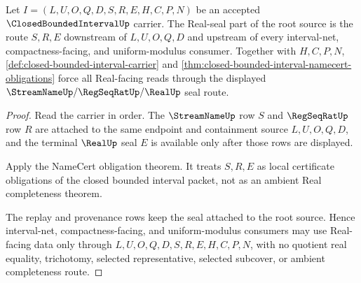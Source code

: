 \begin{theorem}
\label{thm:closed-bounded-interval-root-seal-split}
Let $I=(L,U,O,Q,D,S,R,E,H,C,P,N)$ be an accepted $\ClosedBoundedIntervalUp$ carrier. The Real-seal part of the root source is the route $S,R,E$ downstream of $L,U,O,Q,D$ and upstream of every interval-net, compactness-facing, and uniform-modulus consumer. Together with $H,C,P,N$, \autoref{def:closed-bounded-interval-carrier} and \autoref{thm:closed-bounded-interval-namecert-obligations} force all Real-facing reads through the displayed $\StreamNameUp/\RegSeqRatUp/\RealUp$ seal route.
\end{theorem}
\begin{proof}
Read the carrier in order. The $\StreamNameUp$ row $S$ and $\RegSeqRatUp$ row $R$ are attached to the same endpoint and containment source $L,U,O,Q,D$, and the terminal $\RealUp$ seal $E$ is available only after those rows are displayed.

Apply the NameCert obligation theorem. It treats $S,R,E$ as local certificate obligations of the closed bounded interval packet, not as an ambient Real completeness theorem.

The replay and provenance rows keep the seal attached to the root source. Hence interval-net, compactness-facing, and uniform-modulus consumers may use Real-facing data only through $L,U,O,Q,D,S,R,E,H,C,P,N$, with no quotient real equality, trichotomy, selected representative, selected subcover, or ambient completeness route.
\end{proof}

